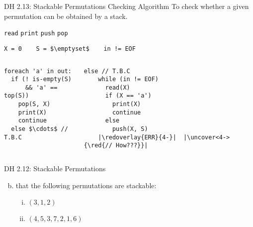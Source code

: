 \begin{frame}[fragile]{}
  \begin{exampleblock}{DH 2.13: Stackable Permutations Checking Algorithm}
    To check whether a given permutation can be obtained by a stack.

    \centerline{\texttt{read} \quad \texttt{print} \quad \texttt{push} \quad \texttt{pop} \quad {}}
  \end{exampleblock}


  \begin{lstlisting}[style = Cstyle]
              X = 0    S = $\emptyset$    in != EOF
  \end{lstlisting}

  \begin{columns}
    \pause
      \begin{lstlisting}[style = Cstyle]
foreach 'a' in out:
  if (! is-empty(S) 
      && 'a' == top(S))
    pop(S, X)
    print(X)
    continue
  else $\cdots$ // T.B.C
      \end{lstlisting}
    \pause
      \begin{lstlisting}[style = Cstyle]
  else // T.B.C
    while (in != EOF)
      read(X)
      if (X == 'a')
        print(X)
        continue
      else
        push(X, S)
    |\redoverlay{ERR}{4-}|  |\uncover<4->{\red{// How???}}|
      \end{lstlisting}
  \end{columns}
\end{frame}

\begin{frame}{}
  \begin{exampleblock}{DH 2.12: Stackable Permutations}
    \begin{enumerate}[(a)]
      \setcounter{enumi}{1}
    \item {} that the following permutations are \emph{} stackable:
	\begin{enumerate}[(i)]
	  \item $(3, 1, 2)$
	  \item $(4, 5, 3, 7, 2, 1, 6)$
	\end{enumerate}
    \end{enumerate}
  \end{exampleblock}



\end{frame}

